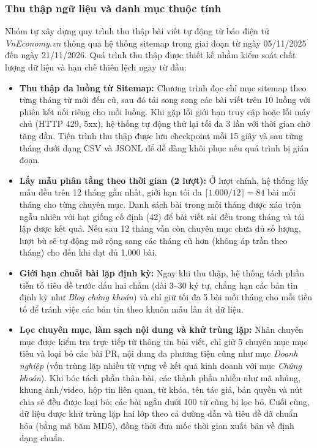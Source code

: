 \subsubsection{Thu thập ngữ liệu và danh mục thuộc tính}
Nhóm tự xây dựng quy trình thu thập bài viết tự động từ báo điện tử \textit{VnEconomy.vn} thông qua hệ thống sitemap trong giai đoạn từ ngày 05/11/2025 đến ngày 21/11/2026. Quá trình thu thập được thiết kế nhằm kiểm soát chất lượng dữ liệu và hạn chế thiên lệch ngay từ đầu:

\begin{itemize}[leftmargin=*]
  \item \textbf{Thu thập đa luồng từ Sitemap:} Chương trình đọc chỉ mục sitemap theo từng tháng từ mới đến cũ, sau đó tải song song các bài viết trên 10 luồng với phiên kết nối riêng cho mỗi luồng. Khi gặp lỗi giới hạn truy cập hoặc lỗi máy chủ (HTTP 429, 5xx), hệ thống tự động thử lại tối đa 3 lần với thời gian chờ tăng dần. Tiến trình thu thập được lưu checkpoint mỗi 15 giây và sau từng tháng dưới dạng CSV và JSONL để dễ dàng khôi phục nếu quá trình bị gián đoạn.
  \item \textbf{Lấy mẫu phân tầng theo thời gian (2 lượt):} Ở lượt chính, hệ thống lấy mẫu đều trên 12 tháng gần nhất, giới hạn tối đa $\lceil 1.000 / 12 \rceil = 84$ bài mỗi tháng cho từng chuyên mục. Danh sách bài trong mỗi tháng được xáo trộn ngẫu nhiên với hạt giống cố định (42) để bài viết rải đều trong tháng và tái lập được kết quả. Nếu sau 12 tháng vẫn còn chuyên mục chưa đủ số lượng, lượt bù sẽ tự động mở rộng sang các tháng cũ hơn (không áp trần theo tháng) cho đến khi đạt đủ 1.000 bài.
  \item \textbf{Giới hạn chuỗi bài lặp định kỳ:} Ngay khi thu thập, hệ thống tách phần tiền tố tiêu đề trước dấu hai chấm (dài 3--30 ký tự, chẳng hạn các bản tin định kỳ như \textit{Blog chứng khoán}) và chỉ giữ tối đa 5 bài mỗi tháng cho mỗi tiền tố để tránh việc các bản tin theo khuôn mẫu lấn át dữ liệu.
  \item \textbf{Lọc chuyên mục, làm sạch nội dung và khử trùng lặp:} Nhãn chuyên mục được kiểm tra trực tiếp từ thông tin bài viết, chỉ giữ 5 chuyên mục mục tiêu và loại bỏ các bài PR, nội dung đa phương tiện cũng như mục \textit{Doanh nghiệp} (vốn trùng lặp nhiều từ vựng về kết quả kinh doanh với mục \textit{Chứng khoán}). Khi bóc tách phần thân bài, các thành phần nhiễu như mã nhúng, khung ảnh/video, hộp tin liên quan, từ khóa, tên tác giả, bản quyền và nút chia sẻ đều được loại bỏ; các bài ngắn dưới 100 từ cũng bị lọc bỏ. Cuối cùng, dữ liệu được khử trùng lặp hai lớp theo cả đường dẫn và tiêu đề đã chuẩn hóa (bằng mã băm MD5), đồng thời đưa mốc thời gian xuất bản về định dạng chuẩn.
\end{itemize}

